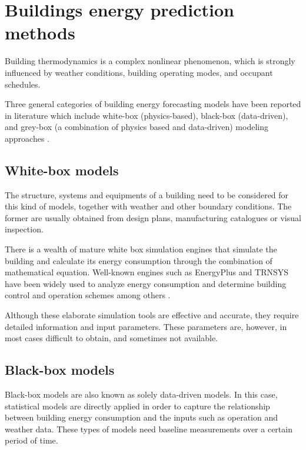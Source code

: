 \documentclass[10pt, conference, compsocconf]{IEEEtran}
\begin{document}


\section{Buildings energy prediction methods}

Building thermodynamics is a complex nonlinear phenomenon, which is strongly influenced by weather conditions, building operating modes, and occupant schedules.

Three general categories of building energy forecasting models have been reported in literature which include white-box (physics-based), black-box (data-driven), and grey-box (a combination of physics based and data-driven) modeling approaches \cite{li2014review}.

\subsection{White-box models}


The structure, systems and equipments of a building need to be considered for this kind of models, together with weather and other boundary conditions. The former are usually obtained from design plans, manufacturing catalogues or visual inspection.

There is a wealth of mature white box simulation engines that simulate the building and calculate its energy consumption through the combination of mathematical equation. Well-known engines such as EnergyPlus \cite{crawley2001energyplus} and TRNSYS \cite{TRNSYS} have been widely used to analyze energy consumption and determine building control and operation schemes among others \cite{crawley2008contrasting}.

Although these elaborate simulation tools are effective and accurate, they require detailed information and input parameters. These parameters are, however, in most cases difficult to obtain, and sometimes not available.

\subsection{Black-box models}


Black-box models are also known as solely data-driven models. In this case, statistical models are directly applied in order to capture the relationship between building energy consumption and the inputs such as operation and weather data. These types of models need baseline measurements over a certain period of time.
\end{document}
